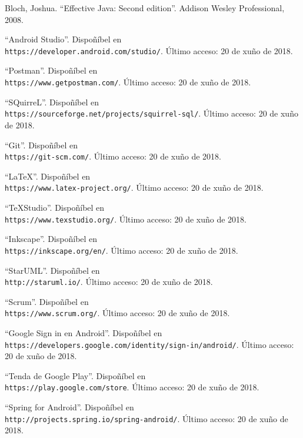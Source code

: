 \documentclass[11pt, a4paper, twoside, titlepage]{book}
\begin{document}
\begin{thebibliography}{9}
	Bloch, Joshua.
	``Effective Java: Second edition''.
	Addison Wesley Professional, 2008.
	
	``Android Studio''. Dispoñíbel en \\\texttt{https://developer.android.com/studio/}. Último acceso: 20 de xuño de 2018.
	
	``Postman''. Dispoñíbel en \\\texttt{https://www.getpostman.com/}. Último acceso: 20 de xuño de 2018.
	
	``SQuirreL''. Dispoñíbel en \\\texttt{https://sourceforge.net/projects/squirrel-sql/}. Último acceso: 20 de xuño de 2018.
	
	``Git''. Dispoñíbel en \\\texttt{https://git-scm.com/}. Último acceso: 20 de xuño de 2018.
	
	``LaTeX''. Dispoñíbel en \\\texttt{https://www.latex-project.org/}. Último acceso: 20 de xuño de 2018.
	
	``TeXStudio''. Dispoñíbel en \\\texttt{https://www.texstudio.org/}. Último acceso: 20 de xuño de 2018.
	
	``Inkscape''. Dispoñíbel en \\\texttt{https://inkscape.org/en/}. Último acceso: 20 de xuño de 2018.
	
	``StarUML''. Dispoñíbel en \\\texttt{http://staruml.io/}. Último acceso: 20 de xuño de 2018.
	
	``Scrum''. Dispoñíbel en \\\texttt{https://www.scrum.org/}. Último acceso: 20 de xuño de 2018.
	
	``Google Sign in en Android''. Dispoñíbel en \\\texttt{https://developers.google.com/identity/sign-in/android/}. Último acceso: 20 de xuño de 2018.
	
	``Tenda de Google Play''. Dispoñíbel en \\\texttt{https://play.google.com/store}. Último acceso: 20 de xuño de 2018.
	
	``Spring for Android''. Dispoñíbel en \\\texttt{http://projects.spring.io/spring-android/}. Último acceso: 20 de xuño de 2018.
	

\end{thebibliography}
\end{document}
